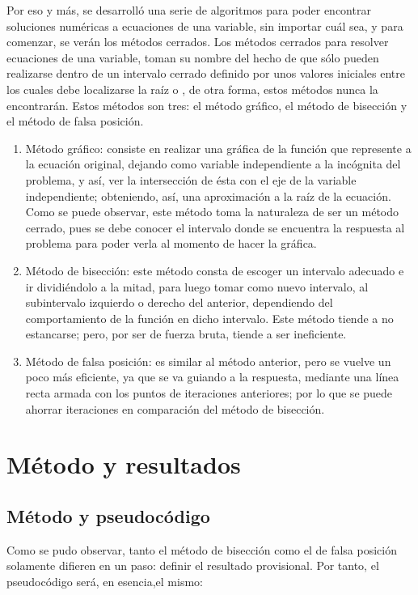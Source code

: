 \documentclass[12pt,oneside,FLEQN]{report}
\begin{document}
{	Por eso y más, se desarrolló una serie de algoritmos para poder encontrar soluciones numéricas a ecuaciones de una variable, sin importar cuál sea, y para comenzar, se verán los métodos cerrados. Los métodos cerrados para resolver ecuaciones de una variable, toman su nombre del hecho de que sólo pueden realizarse dentro de un intervalo cerrado definido por unos valores iniciales entre los cuales debe localizarse la raíz o , de otra forma, estos métodos nunca la encontrarán. Estos métodos son tres: el método gráfico, el método de bisección y el método de falsa posición. 
	\begin{enumerate}
		\item Método gráfico: consiste en realizar una gráfica de la función que represente a la ecuación original, dejando como variable independiente a la incógnita del problema, y así, ver la intersección de ésta con el eje de la variable independiente; obteniendo, así, una aproximación a la raíz de la ecuación.\\
			Como se puede observar, este método toma la naturaleza de ser un método cerrado, pues se debe conocer el intervalo donde se encuentra la respuesta al problema para poder verla al momento de hacer la gráfica.
		\item Método de bisección: este método consta de escoger un intervalo adecuado e ir dividiéndolo a la mitad, para luego tomar como nuevo intervalo, al subintervalo izquierdo o derecho del anterior, dependiendo del comportamiento de la función en dicho intervalo. Este método tiende a no estancarse; pero, por ser de fuerza bruta, tiende a ser ineficiente.
		\item Método de falsa posición: es similar al método anterior, pero se vuelve un poco más eficiente, ya que se va guiando a la respuesta, mediante una línea recta armada con los puntos de iteraciones anteriores; por lo que se puede ahorrar iteraciones en comparación del método de bisección.
	\end{enumerate}
\chapter{Método y resultados}
	\section{Método y pseudocódigo}
Como se pudo observar, tanto el método de bisección como el de falsa posición solamente difieren en un paso: definir el resultado provisional. Por tanto, el pseudocódigo será, en esencia,el mismo:
	
}
\end{document}
